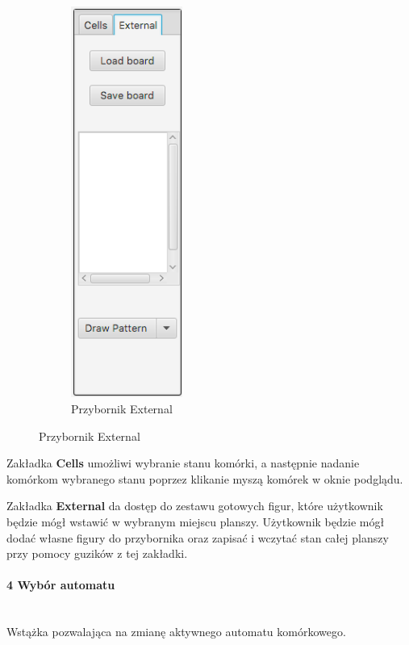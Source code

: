 \documentclass{report}
\begin{document}
\begin{figure}[H]
\begin{subfigure}[b]{0.49\textwidth}
        \includegraphics[width=0.4\textwidth]{przybornik2}
        \caption{Przybornik External}
    \end{subfigure}
\end{figure}

Zakładka \textbf{Cells} umożliwi wybranie stanu komórki, a następnie nadanie komórkom wybranego stanu poprzez klikanie myszą komórek w oknie podglądu.

Zakładka \textbf{External} da dostęp do zestawu gotowych figur, które użytkownik będzie mógł wstawić w wybranym miejscu planszy. Użytkownik będzie mógł dodać własne figury do przybornika oraz zapisać i wczytać stan całej planszy przy pomocy guzików z tej zakładki.

\paragraph{4 Wybór automatu} \mbox{} \\
Wstążka pozwalająca na zmianę aktywnego automatu komórkowego.
\end{document}
